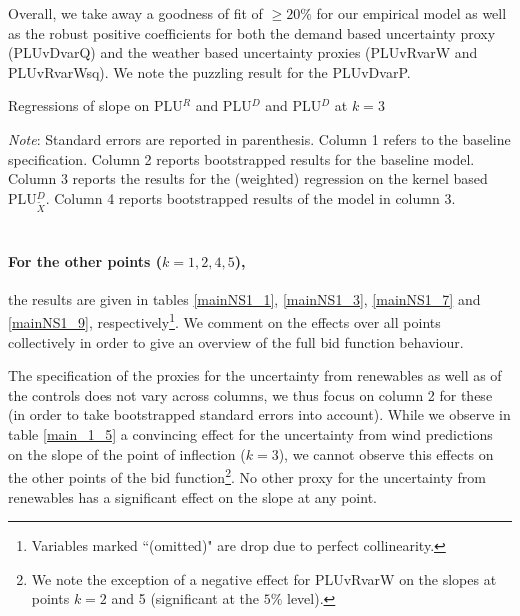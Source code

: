 Overall, we take away a goodness of fit of $\geq 20\%$ for our empirical model as well as the robust positive coefficients for both the demand based uncertainty proxy (PLUvDvarQ) and the weather based uncertainty proxies (PLUvRvarW and PLUvRvarWsq). We note the puzzling result for the PLUvDvarP. 

%

\begin{table}[!ht]
\vspace{-2.38cm}

\caption{\label{main_1_5} Regressions of slope on PLU$^R$ and PLU$^{D}$ and PLU$^{D}$ at $k=3$}
\emph{Note}: Standard errors are reported in parenthesis. Column 1 refers to the baseline specification. Column 2 reports bootstrapped results for the baseline model. Column 3 reports the results for the (weighted) regression on the kernel based PLU$^D_{\tilde{X}}$. Column 4 reports bootstrapped results of the model in column 3. 
\end{table}
\pagestyle{empty}

\section*{}
\paragraph{For the other points  ($k=1,2,4,5$),} the results are given in tables \ref{mainNS1_1}, \ref{mainNS1_3}, \ref{mainNS1_7} and \ref{mainNS1_9}, respectively\footnote{Variables marked ``(omitted)" are drop due to perfect collinearity.}. We comment on the effects over all points collectively in order to give an overview of the full bid function behaviour. %

The specification of the proxies for the uncertainty from renewables as well as of the controls does not vary across columns, we thus focus on column 2 for these (in order to take bootstrapped standard errors into account). 
While we observe in table \ref{main_1_5} a convincing effect for the uncertainty from wind predictions on the slope of the point of inflection ($k=3$), we cannot observe this effects on the other points of the bid function\footnote{We note the exception of a negative effect for PLUvRvarW on the slopes at points $k=2$ and 5 (significant at the $5\%$ level).}. No other proxy for the uncertainty from renewables has a significant effect on the slope at any point. \\

